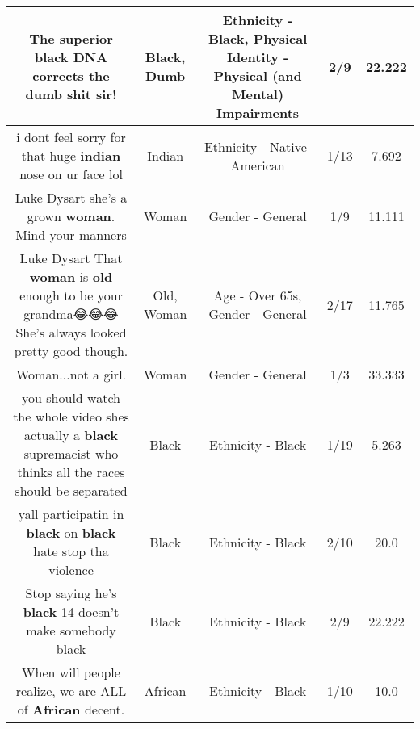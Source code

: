 \documentclass[11pt]{article}
\newlength\mylength
\begin{document}
\begin{center}
\begin{longtable}{|C{.65\mylength}|C{.30\mylength}|C{.12\mylength}|C{.12\mylength}|C{.12\mylength}|}
  \small The superior \textbf{black} DNA corrects the \textbf{dumb} shit sir!\normalsize   & Black, Dumb & Ethnicity - Black, Physical Identity - Physical (and Mental) Impairments & 2/9 & 22.222 \\  \hline
  \small i dont feel sorry for that huge \textbf{indian} nose on ur face lol\normalsize   & Indian & Ethnicity - Native-American & 1/13 & 7.692 \\  \hline
  \small Luke Dysart she's a grown \textbf{woman}. Mind your manners\normalsize   & Woman & Gender - General & 1/9 & 11.111 \\  \hline
  \small Luke Dysart That \textbf{woman} is \textbf{old} enough to be your grandma😂😂😂She's always looked pretty good though.\normalsize   & Old, Woman & Age - Over 65s, Gender - General & 2/17 & 11.765 \\  \hline
  \small Woman...not a girl.\normalsize   & Woman & Gender - General & 1/3 & 33.333 \\  \hline
  \small you should watch the whole video shes actually a \textbf{black} supremacist who thinks all the races should be separated\normalsize   & Black & Ethnicity - Black & 1/19 & 5.263 \\  \hline
  \small yall participatin in \textbf{black} on \textbf{black} hate stop tha violence\normalsize   & Black & Ethnicity - Black & 2/10 & 20.0 \\  \hline
  \small Stop saying he's \textbf{black} 14 doesn't make somebody black\normalsize   & Black & Ethnicity - Black & 2/9 & 22.222 \\  \hline
  \small When will people realize, we are ALL of \textbf{African} decent.\normalsize   & African & Ethnicity - Black & 1/10 & 10.0 \\  \hline

\end{longtable}
\end{center}
\end{document}
